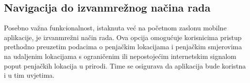 \subsection{Navigacija do izvanmrežnog načina rada}


Posebno važna funkcionalnost, istaknuta već na početnom zaslonu mobilne aplikacije, je izvanmrežni način rada. Ova opcija omogućuje korisnicima pristup prethodno preuzetim podacima o penjačkim lokacijama i penjačkim smjerovima na udaljenim lokacijama s ograničenim ili nepostojećim internetskim signalom poput penjačkih lokacija u prirodi. Time se osigurava da aplikacija bude koristna i u tim uvjetima.

